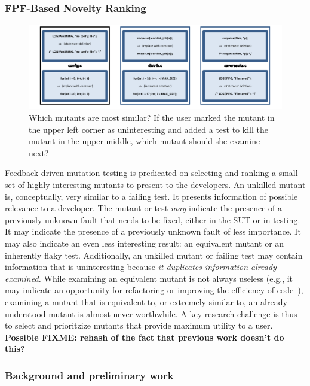 \subsubsection{FPF-Based Novelty Ranking}
\label{sec:fpfplan}

\begin{figure}[t]
\centering
\includegraphics[width=0.95\columnwidth]{distmetric}

\caption{Which mutants are most similar?  If the user marked the
  mutant in the upper left corner as uninteresting and added a test
  to kill the
  mutant in the upper middle, which mutant
  should she examine next?}
\label{fig:distances}
\end{figure}

Feedback-driven mutation testing is predicated on selecting and ranking a small
set of highly interesting mutants to present to the developers.  An unkilled
mutant is, conceptually, very similar to a failing test.  It presents
information of possible relevance to a developer.  The mutant or test \emph{may}
indicate the presence of a previously unknown fault that needs to be fixed,
either in the SUT or in testing.  It may indicate the presence of a previously
unknown fault of less importance.  It may also indicate an even less interesting
result: an equivalent mutant or an inherently flaky test.  Additionally, an
unkilled mutant or failing test may contain information that is uninteresting
because \emph{it duplicates information already examined.}  While examining an
equivalent mutant is not always useless (e.g., it may indicate an opportunity
for refactoring or improving the efficiency of
code~\cite{ivankovic2018industrial,groce2018verified}), examining a mutant that
is equivalent to, or extremely similar to, an already-understood mutant is
almost never worthwhile.  A key research challenge is thus to select and
prioritzize mutants that provide maximum utility to a user.  
\textbf{Possible FIXME: rehash of the fact that previous work doesn't do this?}

\subsubsection{Background and preliminary work} 

